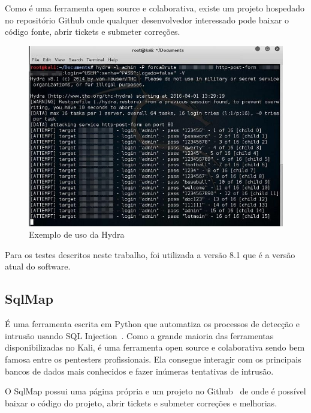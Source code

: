 \documentclass[
    12pt,               %
    openright,          %
    oneside,            %
    a4paper,            %
    section=TITLE,     %
    english,            %
    french,             %
    spanish,            %
    brazil              %
    ]{abntex2}
\newcommand{\citep}{\cite}
\begin{document}
Como é uma ferramenta open source e colaborativa, existe um projeto hospedado no repositório Github onde qualquer desenvolvedor interessado pode baixar o código fonte, abrir tickets e submeter correções.\citep{62221}





\begin{figure}[htp]
\centering
\caption{Exemplo de uso da Hydra}
\includegraphics[width=450px]{image1.jpeg}
\end{figure}
\ifdefined\FloatBarrier \FloatBarrier \fi


Para os testes descritos neste trabalho, foi utilizada a versão 8.1 que é a versão atual do software.



\subsection*{SqlMap}

É uma ferramenta escrita em Python que automatiza os processos de detecção e intrusão usando SQL Injection~. Como a grande maioria das ferramentas disponibilizadas no Kali, é uma ferramenta open source e colaborativa sendo bem famosa entre os pentesters profissionais. Ela consegue interagir com os principais bancos de dados mais conhecidos e fazer inúmeras tentativas de intrusão.


O SqlMap possui uma página própria e um projeto no Github \citep{62222}~de onde é possível baixar o código do projeto, abrir tickets e submeter correções e melhorias.
\end{document}
